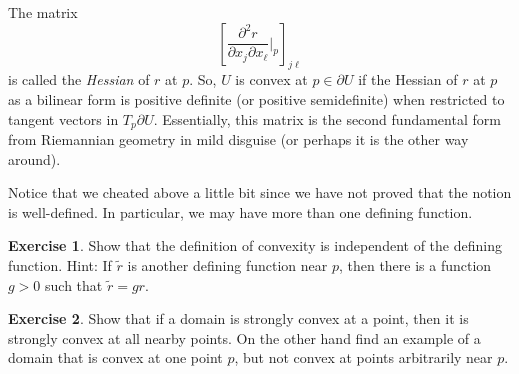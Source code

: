 \documentclass[12pt,openany]{book}
\newcommand{\myindex}[1]{#1\index{#1}}
\theoremstyle{plain}
\theoremstyle{remark}
\theoremstyle{definition}
\newenvironment{exbox}{%
    \def\FrameCommand{\vrule width 1pt \relax\hspace {10pt}}%
    \MakeFramed {\advance \hsize -\width \FrameRestore }%
}{%
    \endMakeFramed
}
\theoremstyle{exercise}
\newtheorem{exercise}{Exercise}[section]
\theoremstyle{example}
\begin{document}
The matrix
\begin{equation*}
\left[ \frac{\partial^2 r}{\partial x_j \partial x_\ell} \Big|_p
\right]_{j\ell}
\end{equation*}
is called the
\emph{\myindex{Hessian}} of $r$ at $p$.
So, $U$ is convex at $p \in \partial U$ if
the Hessian
of $r$ at $p$ as a bilinear form is positive definite (or positive
semidefinite) when restricted to tangent vectors in $T_p \partial U$.
Essentially, this matrix is the second fundamental form from Riemannian
geometry in mild disguise (or perhaps it is the other way around).

Notice that we cheated above a little bit since we have not proved that
the notion is well-defined.  In particular, we may have more than
one defining function.

\begin{exbox}
\begin{exercise}
Show that the definition of convexity is independent of the defining
function.  Hint: If $\tilde{r}$ is another defining function near $p$,
then there is a function $g > 0$ such that $\tilde{r} = g r$.
\end{exercise}

\begin{exercise}
Show that if a domain is strongly convex at a point, then it is
strongly convex at all nearby points.  On the other hand find an example of
a domain that is convex at one point $p$, but not convex at points
arbitrarily near $p$.
\end{exercise}
\end{exbox}
\end{document}
